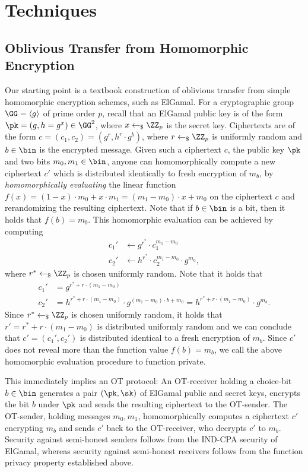 \section{Techniques}
\label{sec:technicalOverview}

\subsection{Oblivious Transfer from Homomorphic Encryption}

Our starting point is a textbook construction of oblivious transfer from simple homomorphic encryption schemes, such as ElGamal. For a cryptographic group $\GG = \langle g \rangle$ of prime order $p$, recall that an ElGamal public key is of the form $\pk = (g,h = g^x) \in \GG^2$, where $x \pick \ZZ_p$ is the secret key. Ciphertexts are of the form $c = (c_1,c_2) = (g^r,h^r \cdot g^b)$, where $r \pick \ZZ_p$ is uniformly random and $b \in \bin$ is the encrypted message. Given such a ciphertext $c$, the public key $\pk$ and two bits $m_0,m_1 \in \bin$, anyone can homomorphically compute a new ciphertext $c'$ which is distributed identically to fresh encryption of $m_b$, by \emph{homomorphically evaluating} the linear function $f(x) = (1-x) \cdot m_0 + x \cdot m_1 = (m_1 - m_0) \cdot x + m_0$ on the ciphertext $c$ and rerandomizing the resulting ciphertext. Note that if $b \in \bin$ is a bit, then it holds that $f(b) = m_b$. This homomorphic evaluation can be achieved by computing
\begin{align*}
    c_1' &\gets g^{r^\ast} \cdot c_1^{m_1 - m_0}\\
    c_2' &\gets h^{r^\ast} \cdot c_2^{m_1 - m_0} \cdot g^{m_0},
\end{align*}
where $r^\ast \pick \ZZ_p$ is chosen uniformly random. Note that it holds that
\begin{align*}
c_1' &= g^{r^\ast + r \cdot (m_1 - m_0)}\\
c_2' &= h^{r^\ast + r \cdot (m_1 - m_0)} \cdot g^{(m_1 - m_0) \cdot b + m_0} = h^{r^\ast + r \cdot (m_1 - m_0)} \cdot g^{m_b}.
\end{align*}
Since $r^\ast \pick \ZZ_p$ is chosen uniformly random, it holds that $r' = r^\ast + r \cdot (m_1 - m_0)$ is distributed uniformly random and we can conclude that $c' = (c_1',c_2')$ is distributed identical to a fresh encryption of $m_b$. Since $c'$ does not reveal more than the function value $f(b) = m_b$, we call the above homomorphic evaluation procedure to function private.

This immediately implies an OT protocol: An OT-receiver holding a choice-bit $b \in \bin$ generates a pair $(\pk,\sk)$ of ElGamal public and secret keys, encrypts the bit $b$ under $\pk$ and sends the resulting ciphertext to the OT-sender. The OT-sender, holding messages $m_0,m_1$, homomorphically computes a ciphertext $c'$ encrypting $m_b$ and sends $c'$ back to the OT-receiver, who decrypts $c'$ to $m_b$. 
Security against semi-honest senders follows from the IND-CPA security of ElGamal, whereas security against semi-honest receivers follows from the function privacy property established above.

